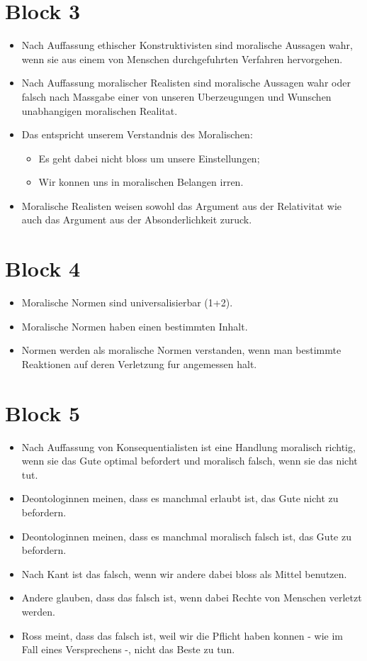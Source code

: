 \documentclass[../main.tex]{subfiles}
\begin{document}
\section{Block 3}
\begin{itemize}
	\item Nach Auffassung ethischer Konstruktivisten sind moralische Aussagen wahr, wenn sie aus einem von Menschen durchgefuhrten Verfahren hervorgehen.
	\item Nach Auffassung moralischer Realisten sind moralische Aussagen wahr oder falsch nach Massgabe einer von unseren Uberzeugungen und Wunschen unabhangigen moralischen Realitat.
	\item Das entspricht unserem Verstandnis des Moralischen: 
	\begin{itemize} 
		\item Es geht dabei nicht bloss um unsere Einstellungen;
		\item Wir konnen uns in moralischen Belangen irren.
	\end{itemize}
	\item Moralische Realisten weisen sowohl das Argument aus der Relativitat wie auch das Argument aus der Absonderlichkeit zuruck.
\end{itemize}

\section{Block 4}
\begin{itemize}
	\item Moralische Normen sind universalisierbar (1+2).
	\item Moralische Normen haben einen bestimmten Inhalt.
	\item Normen werden als moralische Normen verstanden, wenn man bestimmte Reaktionen auf deren Verletzung fur angemessen halt.
\end{itemize}

\section{Block 5}
\begin{itemize}
	\item Nach Auffassung von Konsequentialisten ist eine Handlung moralisch richtig, wenn sie das Gute optimal befordert und moralisch falsch, wenn sie das nicht tut.
	\item Deontologinnen meinen, dass es manchmal erlaubt ist, das Gute nicht zu befordern.
	\item Deontologinnen meinen, dass es manchmal moralisch falsch ist, das Gute zu befordern.
	\item Nach Kant ist das falsch, wenn wir andere dabei bloss als Mittel benutzen.
	\item Andere glauben, dass das falsch ist, wenn dabei Rechte von Menschen verletzt werden.
	\item Ross meint, dass das falsch ist, weil wir die Pflicht haben konnen - wie im Fall eines Versprechens -, nicht das Beste zu tun.
\end{itemize}
\end{document}
